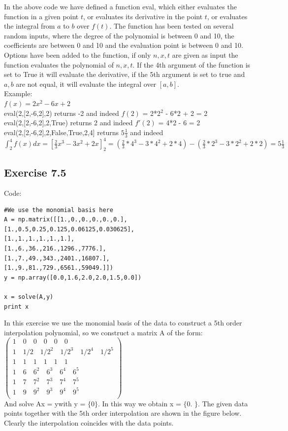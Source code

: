 \documentclass[10pt,a4paper]{article}
\begin{document}
\noindent In the above code we have defined a function eval, which either evaluates the function in a given point $t$, or evaluates its derivative in the point $t$, or evaluates the integral from $a$ to $b$ over $f(t)$. The function has been tested on several random inputs, where the degree of the polynomial is between 0 and 10, the coefficients are between 0 and 10 and the evaluation point is between 0 and 10. Options have been added to the function, if only $n,x,t$ are given as input the function evaluates the polynomial of $n,x,t$. If the 4th argument of the function is set to True it will evaluate the derivative, if the 5th argument is set to true and $a,b$ are not equal, it will evaluate the integral over $[a,b]$.\\
Example:\\
$f(x) = 2x^2 - 6x + 2$\\
eval(2,[2,-6,2],2) returns -2 and indeed $f(2)$ = 2*2$^2$ - 6*2 + 2 = 2\\
eval(2,[2,-6,2],2,True) returns 2 and indeed $f'(2)$ = 4*2 - 6 = 2\\
eval(2,[2,-6,2],2,False,True,2,4] returns $5\frac{1}{3}$ and indeed $\int_{2}^{4} f(x) dx = [\frac{2}{3}x^3 - 3x^2 + 2x ]^{4}_{2} = (\frac{2}{3}*4^3 - 3*4^2 + 2*4) - (\frac{2}{3}*2^3 - 3*2^2 +2*2) = 5\frac{1}{3}$

\subsection*{Exercise 7.5}
Code:
\begin{lstlisting}
#We use the monomial basis here
A = np.matrix([[1.,0.,0.,0.,0.,0.],
[1.,0.5,0.25,0.125,0.06125,0.030625],
[1.,1.,1.,1.,1.,1.],
[1.,6.,36.,216.,1296.,7776.],
[1.,7.,49.,343.,2401.,16807.],
[1.,9.,81.,729.,6561.,59049.]])
y = np.array([0.0,1.6,2.0,2.0,1.5,0.0])

x = solve(A,y)
print x
\end{lstlisting}

\noindent In this exercise we use the monomial basis of the data to construct a 5th order interpolation polynomial, so we construct a matrix A of the form:\\
$
\begin{pmatrix}
1\quad 0\quad 0\quad 0\quad 0\quad 0\quad \\
1\quad 1/2\quad 1/2^2\quad 1/2^3\quad 1/2^4\quad 1/2^5 \\
1\quad 1\quad 1\quad 1\quad 1\quad 1 \\
1\quad 6\quad 6^2\quad 6^3\quad 6^4\quad 6^5 \\
1\quad 7\quad 7^2\quad 7^3\quad 7^4\quad 7^5 \\
1\quad 9\quad 9^2\quad 9^3\quad 9^4\quad 9^5 \\
\end{pmatrix}
$
\\
And solve Ax = y\quad with y = $\{$0$\}$. In this way we obtain x = $\{$0. $\}$. The given data points together with the 5th order interpolation are shown in the figure below. Clearly the interpolation coincides with the data points.
\end{document}
